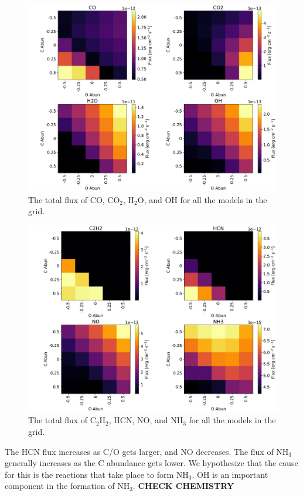 \documentclass[twoside, single, authoryear, semicolon, 12pt]{lion-msc}
\newcommand{\4}{$_4$}
\newcommand{\3}{$_3$}
\newcommand{\2}{$_2$}
\begin{document}
\begin{figure}[!ht]
    \centering
    \includegraphics[width=\linewidth]{Figures/Heatmaps1.pdf}
    \caption{The total flux of CO, CO\2, H\2O, and OH for all the models in the grid.}
    \label{fig: Heatmaps1}
\end{figure}
\begin{figure}[!ht]
    \centering
    \includegraphics[width=\linewidth]{Figures/Heatmaps2.pdf}
    \caption{The total flux of C\2H\2, HCN, NO, and NH\3 for all the models in the grid.}
    \label{fig: Heatmaps2}
\end{figure}

The HCN flux increases as C/O gets larger, and NO decreases. The flux of NH\3 generally increases as the C abundance gets lower. We hypothesize that the cause for this is the reactions that take place to form NH\3.
OH is an important component in the formation of NH\3. \textbf{CHECK CHEMISTRY}
\end{document}
